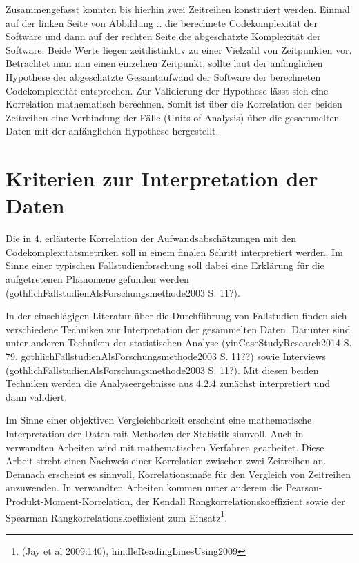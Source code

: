 Zusammengefasst konnten bis hierhin zwei Zeitreihen konstruiert werden.
Einmal auf der linken Seite von Abbildung .. die berechnete
Codekomplexität der Software und dann auf der rechten Seite die
abgeschätzte Komplexität der Software. Beide Werte liegen zeitdistinktiv
zu einer Vielzahl von Zeitpunkten vor. Betrachtet man nun einen
einzelnen Zeitpunkt, sollte laut der anfänglichen Hypothese der
abgeschätzte Gesamtaufwand der Software der berechneten Codekomplexität
entsprechen. Zur Validierung der Hypothese lässt sich eine Korrelation
mathematisch berechnen. Somit ist über die Korrelation der beiden
Zeitreihen eine Verbindung der Fälle (Units of Analysis) über die
gesammelten Daten mit der anfänglichen Hypothese hergestellt.

\section{Kriterien zur Interpretation der Daten}\label{kriterien-zur-interpretation-der-daten}

Die in 4. erläuterte Korrelation der Aufwandsabschätzungen mit den
Codekomplexitätsmetriken soll in einem finalen Schritt interpretiert
werden. Im Sinne einer typischen Fallstudienforschung soll dabei eine
Erklärung für die aufgetretenen Phänomene gefunden werden
(gothlichFallstudienAlsForschungsmethode2003 S. 11?).

In der einschlägigen Literatur über die Durchführung von Fallstudien
finden sich verschiedene Techniken zur Interpretation der gesammelten
Daten. Darunter sind unter anderen Techniken der statistischen Analyse
(yinCaseStudyResearch2014 S. 79,
gothlichFallstudienAlsForschungsmethode2003 S. 11??) sowie Interviews
(gothlichFallstudienAlsForschungsmethode2003 S. 11?). Mit diesen beiden
Techniken werden die Analyseergebnisse aus 4.2.4 zunächst interpretiert
und dann validiert.

Im Sinne einer objektiven Vergleichbarkeit erscheint eine mathematische
Interpretation der Daten mit Methoden der Statistik sinnvoll. Auch in
verwandten Arbeiten wird mit mathematischen Verfahren gearbeitet. Diese
Arbeit strebt einen Nachweis einer Korrelation zwischen zwei Zeitreihen
an. Demnach erscheint es sinnvoll, Korrelationsmaße für den Vergleich
von Zeitreihen anzuwenden. In verwandten Arbeiten kommen unter anderem
die Pearson-Produkt-Moment-Korrelation, der Kendall
Rangkorrelationskoeffizient sowie der Spearman
Rangkorrelationskoeffizient zum Einsatz\footnote{(Jay et al 2009:140),
  hindleReadingLinesUsing2009}.

